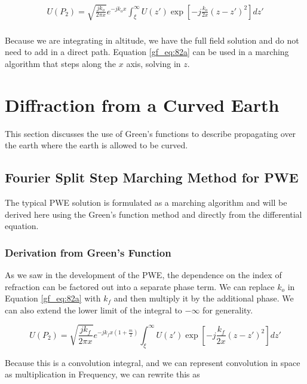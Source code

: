 \begin{equation}
\begin{aligned}
\boxed{U(P_2) =\sqrt{\frac{jk_o}{2\pi x}}e^{-jk_ox}\int_{\xi}^{\infty}U(z') \exp\left[-j \frac{k_o}{2x}\left(z-z'\right)^2 \right]dz'}\\
\end{aligned}
\label{gf_eq:82a}
\end{equation}
\renewcommand{\baselinestretch}{2} \small\normalsize

Because we are integrating in altitude, we have the full field solution and do not need to add in a direct path. Equation \ref{gf_eq:82a} can be used in a marching algorithm that steps along the $x$ axis, solving in $z$.

\section{Diffraction from a Curved Earth}
This section discusses the use of Green's functions to describe propagating over the earth where the earth is allowed to be curved.

\subsection{Fourier Split Step Marching Method for PWE}
The typical PWE solution is formulated as a marching algorithm and will be derived here using the Green's function method and directly from the differential equation. 

\subsubsection{Derivation from Green's Function}
As we saw in the development of the PWE, the dependence on the index of refraction can be factored out into a separate phase term. We can replace $k_o$ in Equation \ref{gf_eq:82a} with $k_f$ and then multiply it by the additional phase. We can also extend the lower limit of the integral to $-\infty$ for generality.

\begin{equation}
U(P_2) =\sqrt{\frac{jk_f}{2\pi x}}e^{-jk_fx\left(1+\frac{m}{2}\right)}\int_{\xi}^{\infty}U(z') \exp\left[-j \frac{k_f}{2x}\left(z-z'\right)^2 \right]dz'
\label{gf_eq:301}
\end{equation}
\renewcommand{\baselinestretch}{2} \small\normalsize

Because this is a convolution integral, and we can represent convolution in space as multiplication in Frequency, we can rewrite this as

